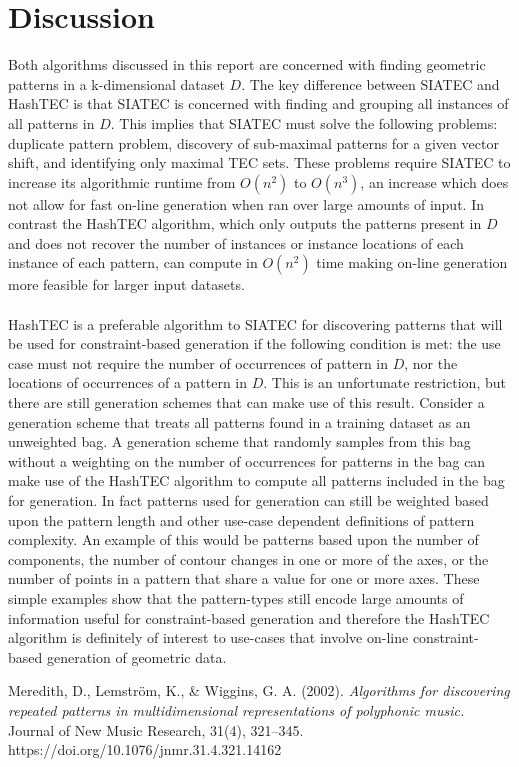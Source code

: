 \documentclass[12pt]{article}
\begin{document}
\section{Discussion}
Both algorithms discussed in this report are concerned with finding geometric patterns in a k-dimensional dataset $D$. The key difference between SIATEC and HashTEC is that SIATEC is concerned with finding and grouping all instances of all patterns in $D$. This implies that SIATEC must solve the following problems: duplicate pattern problem, discovery of sub-maximal patterns for a given vector shift, and identifying only maximal TEC sets. These problems require SIATEC to increase its algorithmic runtime from $O(n^2)$ to $O(n^3)$, an increase which does not allow for fast on-line generation when ran over large amounts of input. In contrast the HashTEC algorithm, which only outputs the patterns present in $D$ and does not recover the number of instances or instance locations of each instance of each pattern, can compute in $O(n^2)$ time making on-line generation more feasible for larger input datasets.
\\
\\HashTEC is a preferable algorithm to SIATEC for discovering patterns that will be used for constraint-based generation if the following condition is met: the use case must not require the number of occurrences of pattern in $D$, nor the locations of occurrences of a pattern in $D$. This is an unfortunate restriction, but there are still generation schemes that can make use of this result. Consider a generation scheme that treats all patterns found in a training dataset as an unweighted bag. A generation scheme that randomly samples from this bag without a weighting on the number of occurrences for patterns in the bag can make use of the HashTEC algorithm to compute all patterns included in the bag for generation. In fact patterns used for generation can still be weighted based upon the pattern length and other use-case dependent definitions of pattern complexity. An example of this would be patterns based upon the number of components, the number of contour changes in one or more of the axes, or the number of points in a pattern that share a value for one or more axes. These simple examples show that the pattern-types still encode large amounts of information useful for constraint-based generation and therefore the HashTEC algorithm is definitely of interest to use-cases that involve on-line constraint-based generation of geometric data.

\begin{thebibliography}{9}
Meredith, D., Lemström, K., \& Wiggins, G. A. (2002). \textit{Algorithms for discovering repeated patterns in multidimensional representations of polyphonic music.} Journal of New Music Research, 31(4), 321–345. https://doi.org/10.1076/jnmr.31.4.321.14162
\end{thebibliography}
\end{document}
